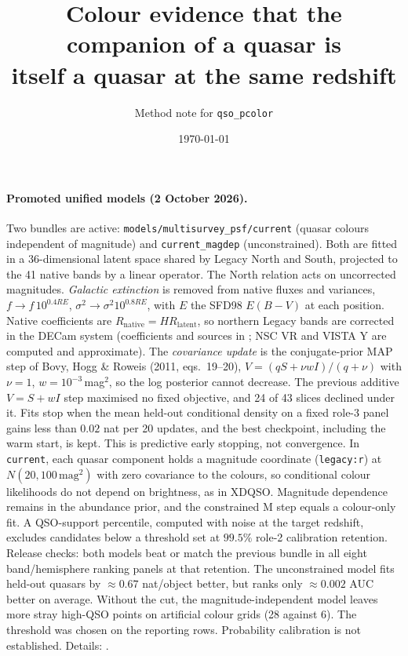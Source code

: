 \documentclass[11pt,a4paper]{article}
\title{Colour evidence that the companion of a quasar is\\
       itself a quasar at the same redshift}
\author{Method note for \texttt{qso\_pcolor}}
\date{\today}
\begin{document}
\maketitle

\paragraph{Promoted unified models (2 October 2026).}
Two bundles are active: \texttt{models/multisurvey\_psf/current} (quasar colours independent of
magnitude) and \texttt{current\_magdep} (unconstrained). Both are fitted in a 36-dimensional latent
space shared by Legacy North and South, projected to the 41 native bands by a linear operator.
The North relation acts on uncorrected magnitudes.
\emph{Galactic extinction} is removed from native fluxes and variances,
$f\to f\,10^{0.4RE}$, $\sigma^2\to\sigma^2 10^{0.8RE}$, with $E$ the SFD98 $E(B-V)$ at each position.
Native coefficients are $R_\mathrm{native}=H R_\mathrm{latent}$, so northern Legacy bands are
corrected in the DECam system (coefficients and sources in
; NSC VR and VISTA Y are computed and approximate).
The \emph{covariance update} is the conjugate-prior MAP step of Bovy, Hogg \& Roweis (2011,
eqs.~19--20), $V=(qS+\nu wI)/(q+\nu)$ with $\nu=1$, $w=10^{-3}$\,mag$^2$, so the log posterior
cannot decrease. The previous additive $V=S+wI$ step maximised no fixed objective, and 24 of 43
slices declined under it. Fits stop when the mean held-out conditional density on a fixed role-3
panel gains less than $0.02$ nat per 20 updates, and the best checkpoint, including the warm
start, is kept. This is predictive early stopping, not convergence.
In \texttt{current}, each quasar component holds a magnitude coordinate (\texttt{legacy:r}) at
$N(20,100\,\mathrm{mag}^2)$ with zero covariance to the colours, so conditional colour
likelihoods do not depend on brightness, as in XDQSO. Magnitude dependence remains in the
abundance prior, and the constrained M step equals a colour-only fit.
A QSO-support percentile, computed with noise at the target redshift, excludes candidates below
a threshold set at $99.5\%$ role-2 calibration retention.
Release checks: both models beat or match the previous bundle in all eight band/hemisphere
ranking panels at that retention. The unconstrained model fits held-out quasars by
$\approx0.67$ nat/object better, but ranks only $\approx0.002$ AUC better on average. Without the
cut, the magnitude-independent model leaves more stray high-QSO points on artificial colour grids
(28 against 6). The threshold was chosen on the reporting rows. Probability calibration is not
established. Details: .
\end{document}
